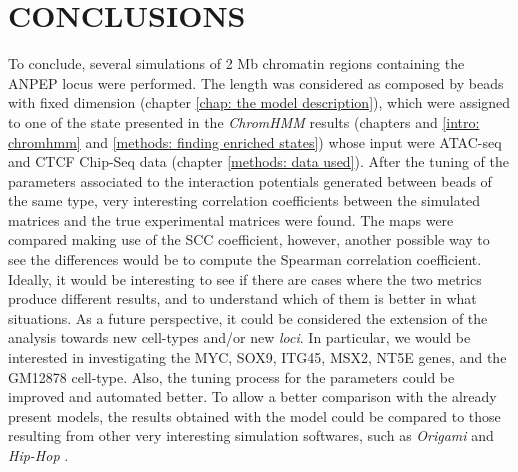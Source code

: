 \section{CONCLUSIONS}
To conclude, several simulations of 2 Mb chromatin regions containing the ANPEP locus were performed. The length was considered as composed by beads with fixed dimension (chapter \ref{chap: the model description}), which were assigned to one of the state presented in the \textit{ChromHMM} results (chapters and \ref{intro: chromhmm} and \ref{methods: finding enriched states}) whose input were ATAC-seq and CTCF Chip-Seq data (chapter \ref{methods: data used}). After the tuning of the parameters associated to the interaction potentials generated between beads of the same type, very interesting correlation coefficients between the simulated matrices and the true experimental matrices were found. %
The maps were compared making use of the SCC coefficient, however, another possible way to see the differences would be to compute the Spearman correlation coefficient. Ideally, it would be interesting to see if there are cases where the two metrics produce different results, and to understand which of them is better in what situations.
As a future perspective, it could be considered the extension of the analysis towards new cell-types and/or new \textit{loci}. In particular, we would be interested in investigating the MYC, SOX9, ITG45, MSX2, NT5E genes, and the GM12878 cell-type. Also, the tuning process for the parameters could be improved and automated better.
To allow a better comparison with the already present models, the results obtained with the model could be compared to those resulting from other very interesting simulation softwares, such as \textit{Origami} and \textit{Hip-Hop}
\cite{bucklePolymerSimulationsHeteromorphic2018,tanCelltypespecificPrediction3D2023}.




